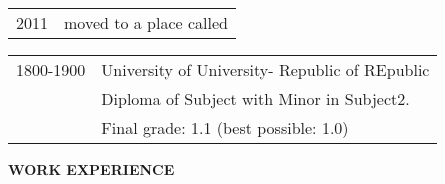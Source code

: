 \documentclass[11pt,english]{article}
\begin{document}
\begin{minipage}{\textwidth}


  
    \begin{tabular}{ @{} p{32mm} l @{} }
    {\small 2011} & {\small moved to a place called}\\\end{tabular}
    \vspace{1mm}
  
    \begin{tabular}{ @{} p{32mm} l @{} }
    {\small 1800-1900} & {\small University of University}\small \hspace{1mm}- Republic of REpublic\\& \small Diploma of Subject with Minor in Subject2.\\& \small \color{maingrey} Final grade: 1.1 (best possible: 1.0)\\\end{tabular}
    \vspace{1mm}
  
  \vspace{2mm}


\end{minipage}%
%
%
%
%
%
%
%

\medskip

\selectfont

\hspace{-20mm}\colorbox{maincolor}{\begin{minipage}[t][8mm][c]{75mm}
\hspace{20mm}\bfseries \color{white}  WORK EXPERIENCE
\end{minipage}}
\vspace{6mm}
\end{document}
